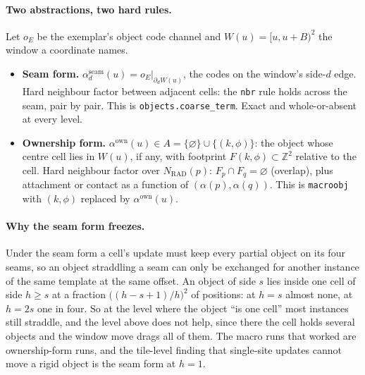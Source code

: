 \documentclass[11pt]{article}
\newcommand{\Z}{\mathbb{Z}}
\newcommand{\1}{\mathds{1}}
\begin{document}
\paragraph{Two abstractions, two hard rules.} Let $o_E$ be the exemplar's object
code channel and $W(u) = [u, u+B)^2$ the window a coordinate names.
\begin{itemize}
  \item \textbf{Seam form.} $\alpha^{\mathrm{seam}}_d(u) = o_E|_{\partial_d W(u)}$, the
        codes on the window's side-$d$ edge. Hard neighbour factor between
        adjacent cells: the \texttt{nbr} rule holds across the seam, pair by pair.
        This is \texttt{objects.coarse\_term}. Exact and whole-or-absent at every
        level.
  \item \textbf{Ownership form.} $\alpha^{\mathrm{own}}(u) \in A = \{\varnothing\} \cup
        \{(k,\phi)\}$: the object whose centre cell lies in $W(u)$, if any, with
        footprint $F(k,\phi) \subset \Z^2$ relative to the cell. Hard neighbour
        factor over $N_{\mathrm{RAD}}(p)$: $F_p \cap F_q = \varnothing$ (overlap), plus
        attachment or contact as a function of $(\alpha(p), \alpha(q))$. This is
        \texttt{macroobj} with $(k,\phi)$ replaced by $\alpha^{\mathrm{own}}(u)$.
\end{itemize}

\paragraph{Why the seam form freezes.} Under the seam form a cell's update must
keep every partial object on its four seams, so an object straddling a seam can
only be exchanged for another instance of the same template at the same offset.
An object of side $s$ lies inside one cell of side $h \ge s$ at a fraction
$\big((h - s + 1)/h\big)^2$ of positions: at $h = s$ almost none, at $h = 2s$
one in four. So at the level where the object ``is one cell'' most instances
still straddle, and the level above does not help, since there the cell holds
several objects and the window move drags all of them. The macro runs that
worked are ownership-form runs, and the tile-level finding that single-site
updates cannot move a rigid object is the seam form at $h = 1$.
\end{document}
